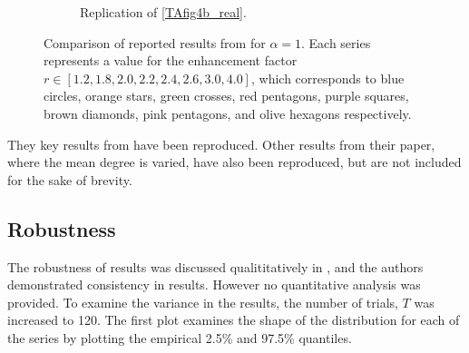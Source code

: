 \begin{figure}[!h]
\begin{subfigure}[b]{0.45\textwidth}
    \caption{Replication of \ref{TAfig4b_real}. }
    \label{TAfig4b}
  \end{subfigure}
  \caption{Comparison of reported results from \cite{RN49} for $\alpha = 1$. Each series represents a value for the enhancement factor $r \in [1.2, 1.8, 2.0, 2.2, 2.4, 2.6, 3.0, 4.0]$, which corresponds to blue circles, orange stars, green crosses, red pentagons, purple squares, brown diamonds, pink pentagons, and olive hexagons respectively. } \label{comp2}
\end{figure} 
\FloatBarrier

They key results from \cite{RN49} have been reproduced. Other results from their paper, where the mean degree is varied, have also been reproduced, but are not included for the sake of brevity.\\


\subsection{Robustness}
The robustness of results was discussed qualititatively in \cite{RN49}, and the authors demonstrated consistency in results. However no quantitative analysis was provided. To examine the variance in the results, the number of trials, $T$ was increased to 120. The first plot examines the shape of the distribution for each of the series by plotting the empirical 2.5\% and 97.5\% quantiles. \\

